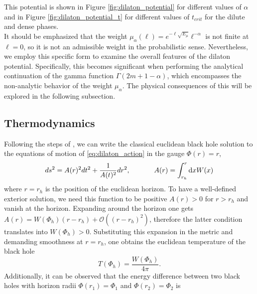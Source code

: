 \documentclass[a4paper,11pt]{article}
\newcommand{\rmd}{\mathrm{d}}
\begin{document}
This potential is shown in Figure \ref{fig:dilaton_potential} for different values of $\alpha$ and in Figure \ref{fig:dilaton_potential_t} for different values of $t_{crit}$ for the dilute and dense phases. \\
It should be emphasized that the weight $\mu_{\alpha}(\ell)= e^{-\ell \sqrt{E_\mu}}\ell^{-\alpha}$ is not finite at $\ell=0$, so it is not an admissible weight in the probabilistic sense. Nevertheless, we employ this specific form to examine the overall features of the dilaton potential. Specifically, this becomes significant when performing the analytical continuation of the gamma function $\Gamma(2m+1-\alpha)$, which encompasses the non-analytic behavior of the weight $\mu_\alpha$. The physical consequences of this will be explored in the following subsection.
\subsection{Thermodynamics}
Following the steps of \cite{Witten:2020ert}, we can write the classical euclidean black hole solution to the equations of motion of \eqref{eq:dilaton_action} in the gauge $\Phi(r)=r$,
      \begin{equation}
       ds^2=A(r)^2dt^2+\frac{1}{A(t)^2}dr^2, \hspace{12mm} A(r)=\int_{r_h}^r \rmd x W(x)
      \end{equation}
where $r=r_h$ is the position of the euclidean horizon. To have a well-defined exterior solution, we need this function to be positive $A(r)>0$ for $r>r_h$ and vanish at the horizon. Expanding around the horizon one gets $A(r)=W(\Phi_h)(r-r_h)+\mathcal{O}((r-r_h)^2)$, therefore the latter condition translates into $W(\Phi_h)>0$. Substituting this expansion in the metric and demanding smoothness at $r=r_h$, one obtains the euclidean temperature of the black hole 
\begin{equation}
    T(\Phi_h)=\frac{W(\Phi_h)}{4\pi}.
\end{equation}
Additionally, it can be observed that the energy difference between two black holes with horizon radii $\Phi(r_1) = \Phi_1$ and $\Phi(r_2) = \Phi_2$ is
\end{document}

